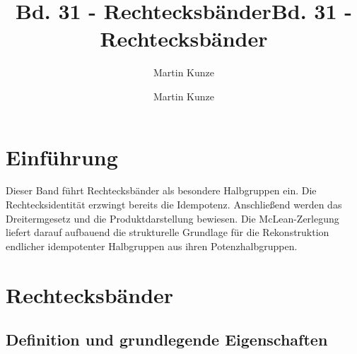 \documentclass[main.tex]{subfiles}
\title{Bd. 31 - Rechtecksbänder}
\author{Martin Kunze}
\date{}
\begin{document}
\title{Bd. 31 - Rechtecksbänder}
\author{Martin Kunze}
\date{}
\hypersetup{pageanchor=false}
\maketitle
\hypersetup{pageanchor=true}
\setcounter{tocdepth}{3}
\tableofcontents
\setcounter{file}{31}
\renewcommand{\FormulaBandID}{31}

\chapter{Einführung}

Dieser Band führt Rechtecksbänder als besondere Halbgruppen ein. Die
Rechtecksidentität erzwingt bereits die Idempotenz. Anschließend werden das
Dreitermgesetz und die Produktdarstellung bewiesen. Die McLean-Zerlegung
liefert darauf aufbauend die strukturelle Grundlage für die Rekonstruktion
endlicher idempotenter Halbgruppen aus ihren Potenzhalbgruppen.

\chapter{Rechtecksbänder}

\section{Definition und grundlegende Eigenschaften}


\end{document}

